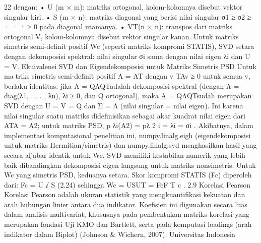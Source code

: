 22
dengan:
• U (m × m): matriks ortogonal, kolom-kolomnya disebut vektor singular kiri.
• S (m × n): matriks diagonal yang berisi nilai singular σ1 ≥ σ2 ≥ · · · ≥ 0 pada
diagonal utamanya.
• VT(n × n): transpos dari matriks ortogonal V, kolom-kolomnya disebut vektor
singular kanan.
Untuk matriks simetris semi-definit positif Wc (seperti matriks kompromi STATIS), SVD
setara dengan dekomposisi spektral: nilai singular σi sama dengan nilai eigen λi dan
U = V.
Ekuivalensi SVD dan Eigendekomposisi untuk Matriks Simetris PSD Untuk matriks simetris semi-definit positif A = AT dengan v
TAv ≥ 0 untuk semua v, berlaku
identitas: jika A = QΛQTadalah dekomposisi spektral (dengan Λ = diag(λ1, . . . , λn),
λi ≥ 0, dan Q ortogonal), maka A = QΛQTsudah merupakan SVD dengan
U = V = Q dan Σ = Λ (nilai singular = nilai eigen). Ini karena nilai singular suatu
matriks didefinisikan sebagai akar kuadrat nilai eigen dari ATA = A2; untuk matriks PSD,
p
λi(A2) = pλ
2
i = λi = σi
. Akibatnya, dalam implementasi komputasional penelitian
ini, numpy.linalg.eigh (eigendekomposisi untuk matriks Hermitian/simetris) dan
numpy.linalg.svd menghasilkan hasil yang secara aljabar identik untuk Wc.
SVD memiliki kestabilan numerik yang lebih baik dibandingkan dekomposisi eigen
langsung untuk matriks nonsimetris. Untuk Wc yang simetris PSD, keduanya setara. Skor
kompromi STATIS (Fc) diperoleh dari:
Fc = U
√
S (2.24)
sehingga Wc = USUT = FcF
T
c
.
2.9 Korelasi Pearson
Korelasi Pearson adalah ukuran statistik yang mengkuantifikasi kekuatan dan arah
hubungan linier antara dua indikator. Koefisien ini digunakan secara luas dalam analisis
multivariat, khususnya pada pembentukan matriks korelasi yang merupakan fondasi Uji
KMO dan Bartlett, serta pada komputasi loadings (arah indikator dalam Biplot) (Johnson
& Wichern, 2007).
Universitas Indonesia

